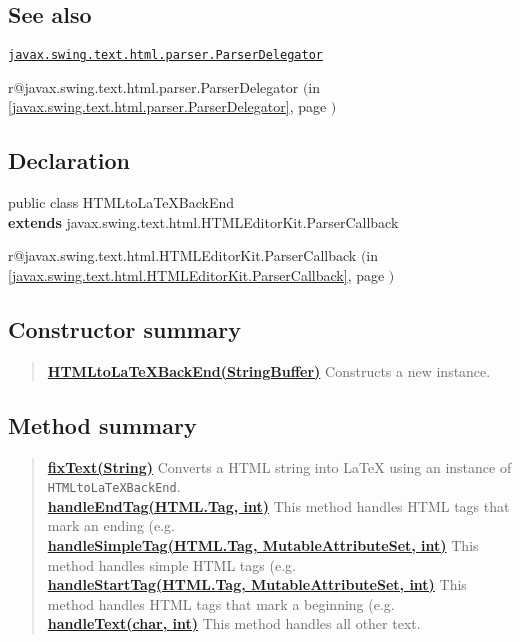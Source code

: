 \documentclass[11pt,a4paper]{report}
\makeatletter
\newcommand{\refdefined}[1]{
\expandafter\ifx\csname r@#1\endcsname\relax
\relax\else
{$($in \ref{#1}, page \pageref{#1}$)$}\fi}
\makeatother
\begin{document}
\subsection{See also}{}

  \begin{list}{-- }{\setlength{\itemsep}{0cm}\setlength{\parsep}{0cm}}
\item{ \texttt{\hyperlink{javax.swing.text.html.parser.ParserDelegator}{javax.swing.text.html.parser.ParserDelegator}} {\small 
\refdefined{javax.swing.text.html.parser.ParserDelegator}}%
} 
  \end{list}
\subsection{Declaration}{
\small public class HTMLtoLaTeXBackEnd
\\ {\bf  extends} javax.swing.text.html.HTMLEditorKit.ParserCallback
\refdefined{javax.swing.text.html.HTMLEditorKit.ParserCallback}}
\subsection{Constructor summary}{
\begin{verse}
\hyperlink{org.stfm.texdoclet.HTMLtoLaTeXBackEnd(java.lang.StringBuffer)}{{\bf HTMLtoLaTeXBackEnd(StringBuffer)}} Constructs a new instance.\\
\end{verse}
}
\subsection{Method summary}{
\begin{verse}
\hyperlink{org.stfm.texdoclet.HTMLtoLaTeXBackEnd.fixText(java.lang.String)}{{\bf fixText(String)}} Converts a HTML string into \LaTeX{} using an instance of \texttt{\small HTMLtoLaTeXBackEnd}.\\
\hyperlink{org.stfm.texdoclet.HTMLtoLaTeXBackEnd.handleEndTag(javax.swing.text.html.HTML.Tag, int)}{{\bf handleEndTag(HTML.Tag, int)}} This method handles HTML tags that mark an ending (e.g.\\
\hyperlink{org.stfm.texdoclet.HTMLtoLaTeXBackEnd.handleSimpleTag(javax.swing.text.html.HTML.Tag, javax.swing.text.MutableAttributeSet, int)}{{\bf handleSimpleTag(HTML.Tag, MutableAttributeSet, int)}} This method handles simple HTML tags (e.g.\\
\hyperlink{org.stfm.texdoclet.HTMLtoLaTeXBackEnd.handleStartTag(javax.swing.text.html.HTML.Tag, javax.swing.text.MutableAttributeSet, int)}{{\bf handleStartTag(HTML.Tag, MutableAttributeSet, int)}} This method handles HTML tags that mark a beginning (e.g.\\
\hyperlink{org.stfm.texdoclet.HTMLtoLaTeXBackEnd.handleText(char[], int)}{{\bf handleText(char\lbrack \rbrack , int)}} This method handles all other text.\\
\end{verse}
}
\end{document}
